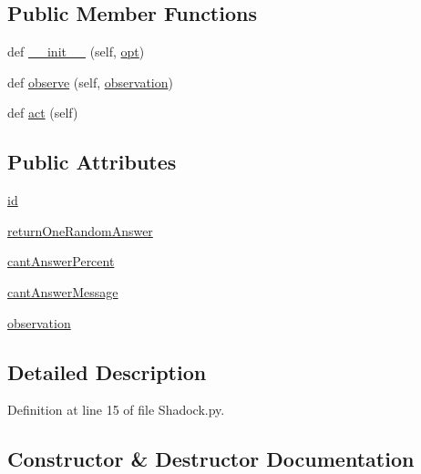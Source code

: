 \subsection*{Public Member Functions}
\begin{DoxyCompactItemize}
\item 
def \hyperlink{classShadock_1_1RepeatLabelAgent_a38d5086f0434cd05f7d6a6c22f37cf43}{\+\_\+\+\_\+init\+\_\+\+\_\+} (self, \hyperlink{classparlai_1_1core_1_1agents_1_1Agent_ab3b45d2754244608c75d4068b90cd051}{opt})
\item 
def \hyperlink{classShadock_1_1RepeatLabelAgent_ae01ff4d505267990982ec0565dccd61d}{observe} (self, \hyperlink{classShadock_1_1RepeatLabelAgent_a690dbe29c2e66b970dfd43046790f2b0}{observation})
\item 
def \hyperlink{classShadock_1_1RepeatLabelAgent_afdec22b589734f9af92ef4234df5d5a1}{act} (self)
\end{DoxyCompactItemize}
\subsection*{Public Attributes}
\begin{DoxyCompactItemize}
\item 
\hyperlink{classShadock_1_1RepeatLabelAgent_a8ea5aed24eebb67bb2eac272141e6dd7}{id}
\item 
\hyperlink{classShadock_1_1RepeatLabelAgent_af5000a81304581727384cf2546b5a238}{return\+One\+Random\+Answer}
\item 
\hyperlink{classShadock_1_1RepeatLabelAgent_af080b1e85afa6f436b169eb6b0359c4b}{cant\+Answer\+Percent}
\item 
\hyperlink{classShadock_1_1RepeatLabelAgent_ab20bd9669e8f2fe85f654e2e81456de7}{cant\+Answer\+Message}
\item 
\hyperlink{classShadock_1_1RepeatLabelAgent_a690dbe29c2e66b970dfd43046790f2b0}{observation}
\end{DoxyCompactItemize}


\subsection{Detailed Description}


Definition at line 15 of file Shadock.\+py.



\subsection{Constructor \& Destructor Documentation}
\mbox{\label{classShadock_1_1RepeatLabelAgent_a38d5086f0434cd05f7d6a6c22f37cf43}} 
